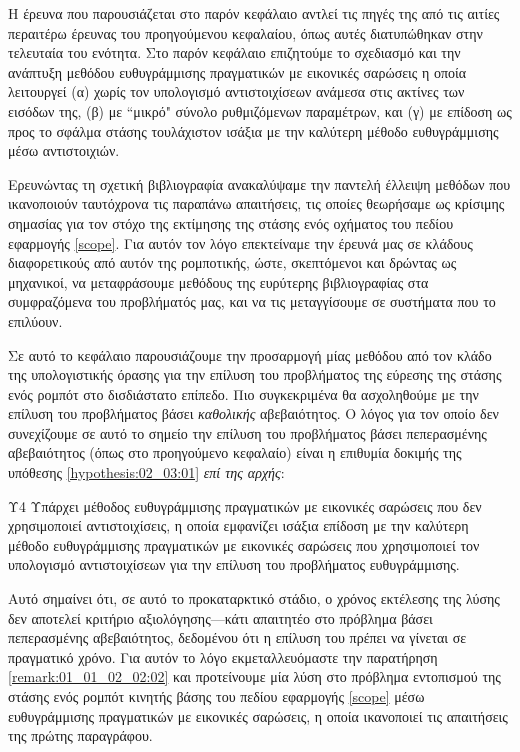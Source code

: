 Η έρευνα που παρουσιάζεται στο παρόν κεφάλαιο αντλεί τις πηγές της από τις
αιτίες περαιτέρω έρευνας του προηγούμενου κεφαλαίου, όπως αυτές διατυπώθηκαν
στην τελευταία του ενότητα. Στο παρόν κεφάλαιο επιζητούμε το σχεδιασμό και
την ανάπτυξη μεθόδου ευθυγράμμισης πραγματικών με εικονικές σαρώσεις η οποία
λειτουργεί (α) χωρίς τον υπολογισμό αντιστοιχίσεων ανάμεσα στις ακτίνες των
εισόδων της, (β) με ``μικρό" σύνολο ρυθμιζόμενων παραμέτρων, και (γ) με
επίδοση ως προς το σφάλμα στάσης τουλάχιστον ισάξια με την καλύτερη μέθοδο
ευθυγράμμισης μέσω αντιστοιχιών.

Ερευνώντας τη σχετική βιβλιογραφία ανακαλύψαμε την παντελή έλλειψη μεθόδων που
ικανοποιούν ταυτόχρονα τις παραπάνω απαιτήσεις, τις οποίες θεωρήσαμε ως
κρίσιμης σημασίας για τον στόχο της εκτίμησης της στάσης ενός οχήματος του
πεδίου εφαρμογής \ref{scope}. Για αυτόν τον λόγο επεκτείναμε την έρευνά μας σε
κλάδους διαφορετικούς από αυτόν της ρομποτικής, ώστε, σκεπτόμενοι και δρώντας
ως μηχανικοί, να μεταφράσουμε μεθόδους της ευρύτερης βιβλιογραφίας στα
συμφραζόμενα του προβλήματός μας, και να τις μεταγγίσουμε σε συστήματα που το
επιλύουν.

Σε αυτό το κεφάλαιο παρουσιάζουμε την προσαρμογή μίας μεθόδου από τον κλάδο της
υπολογιστικής όρασης για την επίλυση του προβλήματος της εύρεσης της στάσης
ενός ρομπότ στο δισδιάστατο επίπεδο. Πιο συγκεκριμένα θα ασχοληθούμε με την
επίλυση του προβλήματος βάσει \textit{καθολικής} αβεβαιότητος. Ο λόγος για τον
οποίο δεν συνεχίζουμε σε αυτό το σημείο την επίλυση του προβλήματος βάσει
πεπερασμένης αβεβαιότητος (όπως στο προηγούμενο κεφαλαίο) είναι η επιθυμία
δοκιμής της υπόθεσης \ref{hypothesis:02_03:01} \textit{επί της αρχής}:

\begin{customhypothesis}{Υ4}
\label{hypothesis:02_03:01}
  Υπάρχει μέθοδος ευθυγράμμισης πραγματικών με εικονικές
  σαρώσεις που δεν χρησιμοποιεί αντιστοιχίσεις, η οποία εμφανίζει ισάξια
  επίδοση με την καλύτερη μέθοδο ευθυγράμμισης πραγματικών με εικονικές
  σαρώσεις που χρησιμοποιεί τον υπολογισμό αντιστοιχίσεων για την επίλυση του
  προβλήματος ευθυγράμμισης.
\end{customhypothesis}

Αυτό σημαίνει ότι, σε αυτό το προκαταρκτικό στάδιο, ο χρόνος εκτέλεσης της
λύσης δεν αποτελεί κριτήριο αξιολόγησης---κάτι απαιτητέο στο πρόβλημα βάσει
πεπερασμένης αβεβαιότητος, δεδομένου ότι η επίλυση του πρέπει να γίνεται σε
πραγματικό χρόνο. Για αυτόν το λόγο εκμεταλλευόμαστε την παρατήρηση
\ref{remark:01_01_02_02:02} και προτείνουμε μία λύση στο πρόβλημα εντοπισμού
της στάσης ενός ρομπότ κινητής βάσης του πεδίου εφαρμογής \ref{scope} μέσω
ευθυγράμμισης πραγματικών με εικονικές σαρώσεις, η οποία ικανοποιεί τις
απαιτήσεις της πρώτης παραγράφου.

